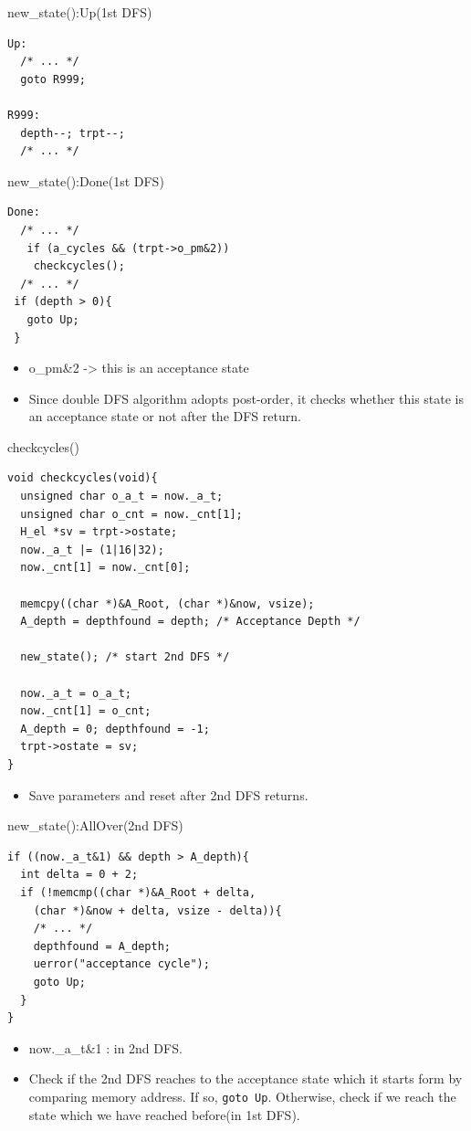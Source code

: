 \documentclass[12pt]{beamer}
\newcommand{\code}[1]{\texttt{#1}}
\begin{document}
\begin{frame}[fragile]{new\_state():Up(1st DFS)}
\begin{lstlisting}[basicstyle=\normalsize\ttfamily]
Up:
  /* ... */
  goto R999;

R999:
  depth--; trpt--;
  /* ... */
\end{lstlisting}
\end{frame}

\begin{frame}[fragile]{new\_state():Done(1st DFS)}
\begin{lstlisting}[basicstyle=\normalsize\ttfamily]
Done:
  /* ... */
   if (a_cycles && (trpt->o_pm&2))
    checkcycles();
  /* ... */
 if (depth > 0){
   goto Up;
 }
\end{lstlisting}
\begin{itemize}
	\item o\_pm\&2  -> this is an acceptance state
	\item Since double DFS algorithm adopts post-order, it checks whether this state is an acceptance state or not after the DFS return. 
\end{itemize}
\end{frame}

\begin{frame}[fragile]{checkcycles()}
\begin{lstlisting}[basicstyle=\footnotesize\ttfamily]
void checkcycles(void){
  unsigned char o_a_t = now._a_t;
  unsigned char o_cnt = now._cnt[1];
  H_el *sv = trpt->ostate;
  now._a_t |= (1|16|32);
  now._cnt[1] = now._cnt[0];

  memcpy((char *)&A_Root, (char *)&now, vsize);
  A_depth = depthfound = depth; /* Acceptance Depth */

  new_state(); /* start 2nd DFS */

  now._a_t = o_a_t;
  now._cnt[1] = o_cnt;
  A_depth = 0; depthfound = -1;
  trpt->ostate = sv;
}
\end{lstlisting}
\begin{itemize}
	\item Save parameters and reset after 2nd DFS returns.
\end{itemize}
\end{frame}

\begin{frame}[fragile]{new\_state():AllOver(2nd DFS)}
\begin{lstlisting}[basicstyle=\footnotesize\ttfamily]
if ((now._a_t&1) && depth > A_depth){
  int delta = 0 + 2;
  if (!memcmp((char *)&A_Root + delta,
    (char *)&now + delta, vsize - delta)){
    /* ... */
    depthfound = A_depth;
    uerror("acceptance cycle");
    goto Up;
  }
}
\end{lstlisting}
\begin{itemize}
	\item now.\_a\_t\&1 : in 2nd DFS.
	\item Check if the 2nd DFS reaches to the acceptance state which it starts form by comparing memory address. If so, \code{goto Up}. Otherwise, check if we reach the state which we have reached before(in 1st DFS).
\end{itemize}
\end{frame}
\end{document}
